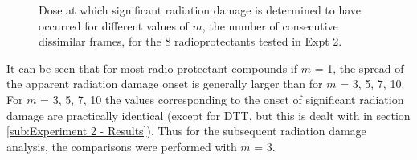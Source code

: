 \begin{figure}
\begin{subfigure}[b]{0.75\textwidth}
            \caption{}
            \label{}
    \end{subfigure}
    \caption[Dose at which significant radiation damage is determined to have occurred for different values of $m$, the number of consecutive dissimilar frames.]{Dose at which significant radiation damage is determined to have occurred for different values of $m$, the number of consecutive dissimilar frames, for the 8 radioprotectants tested in Expt 2.}
    \label{fig:Num consecutive frame test}
\end{figure}
It can be seen that for most radio protectant compounds if $m$ = 1, the spread of the apparent radiation damage onset is generally larger than for $m$ = 3, 5, 7, 10.
For $m$ = 3, 5, 7, 10 the values corresponding to the onset of significant radiation damage are practically identical (except for DTT, but this is dealt with in section \ref{sub:Experiment 2 - Results}).
Thus for the subsequent radiation damage analysis, the comparisons were performed with $m$ = 3.

